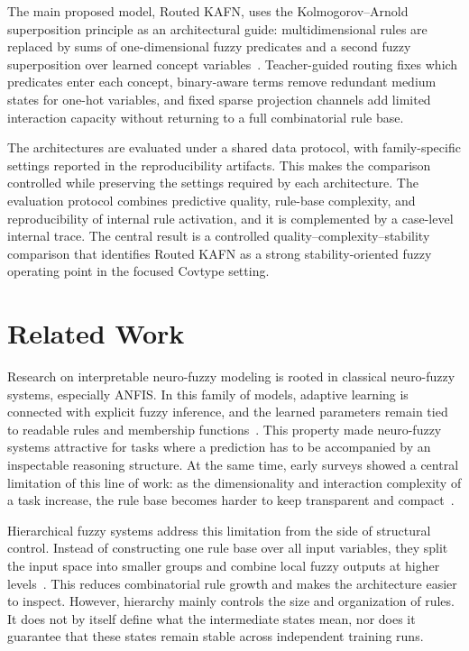 \documentclass[runningheads]{llncs}
\begin{document}
The main proposed model, Routed KAFN, uses the Kolmogorov--Arnold superposition principle as an architectural guide: multidimensional rules are replaced by sums of one-dimensional fuzzy predicates and a second fuzzy superposition over learned concept variables~\cite{kolmogorov1957superposition,arnold1957functions}. Teacher-guided routing fixes which predicates enter each concept, binary-aware terms remove redundant medium states for one-hot variables, and fixed sparse projection channels add limited interaction capacity without returning to a full combinatorial rule base.

The architectures are evaluated under a shared data protocol, with family-specific settings reported in the reproducibility artifacts. This makes the comparison controlled while preserving the settings required by each architecture. The evaluation protocol combines predictive quality, rule-base complexity, and reproducibility of internal rule activation, and it is complemented by a case-level internal trace. The central result is a controlled quality--complexity--stability comparison that identifies Routed KAFN as a strong stability-oriented fuzzy operating point in the focused Covtype setting.

\section{Related Work}

Research on interpretable neuro-fuzzy modeling is rooted in classical neuro-fuzzy systems, especially ANFIS. In this family of models, adaptive learning is connected with explicit fuzzy inference, and the learned parameters remain tied to readable rules and membership functions~\cite{jang1993anfis}. This property made neuro-fuzzy systems attractive for tasks where a prediction has to be accompanied by an inspectable reasoning structure. At the same time, early surveys showed a central limitation of this line of work: as the dimensionality and interaction complexity of a task increase, the rule base becomes harder to keep transparent and compact~\cite{mitra2000neurofuzzy}.

Hierarchical fuzzy systems address this limitation from the side of structural control. Instead of constructing one rule base over all input variables, they split the input space into smaller groups and combine local fuzzy outputs at higher levels~\cite{magdalena2019semantic,razak2022hierarchical}. This reduces combinatorial rule growth and makes the architecture easier to inspect. However, hierarchy mainly controls the size and organization of rules. It does not by itself define what the intermediate states mean, nor does it guarantee that these states remain stable across independent training runs.
\end{document}

